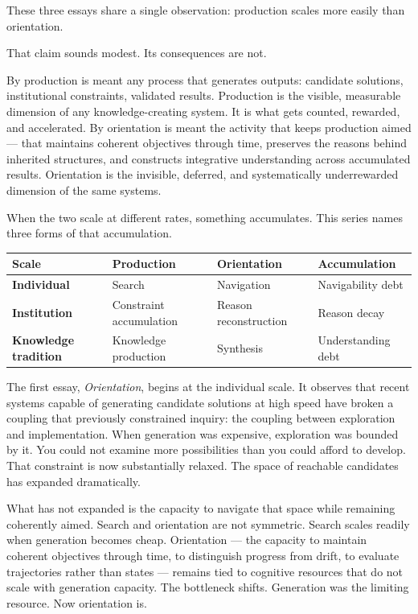 
\newpage


These three essays share a single observation: production scales more easily
than orientation.

That claim sounds modest. Its consequences are not.

By production is meant any process that generates outputs: candidate solutions,
institutional constraints, validated results. Production is the visible,
measurable dimension of any knowledge-creating system. It is what gets counted,
rewarded, and accelerated. By orientation is meant the activity that keeps
production aimed --- that maintains coherent objectives through time, preserves
the reasons behind inherited structures, and constructs integrative understanding
across accumulated results. Orientation is the invisible, deferred, and
systematically underrewarded dimension of the same systems.

When the two scale at different rates, something accumulates. This series
names three forms of that accumulation.

\bigskip
\begin{center}
\begin{tabular}{>{\bfseries}p{3cm} p{3.2cm} p{3cm} p{3.4cm}}
\toprule
Scale & Production & Orientation & Accumulation \\
\midrule
Individual & Search & Navigation & Navigability debt \\[0.4em]
Institution & Constraint accumulation & Reason reconstruction & Reason decay \\[0.4em]
Knowledge tradition & Knowledge production & Synthesis & Understanding debt \\
\bottomrule
\end{tabular}
\end{center}
\bigskip

The first essay, \textit{Orientation}, begins at the individual scale. It
observes that recent systems capable of generating candidate solutions at
high speed have broken a coupling that previously constrained inquiry: the
coupling between exploration and implementation. When generation was expensive,
exploration was bounded by it. You could not examine more possibilities than
you could afford to develop. That constraint is now substantially relaxed.
The space of reachable candidates has expanded dramatically.

What has not expanded is the capacity to navigate that space while remaining
coherently aimed. Search and orientation are not symmetric. Search scales
readily when generation becomes cheap. Orientation --- the capacity to maintain
coherent objectives through time, to distinguish progress from drift, to
evaluate trajectories rather than states --- remains tied to cognitive resources
that do not scale with generation capacity. The bottleneck shifts. Generation
was the limiting resource. Now orientation is.

